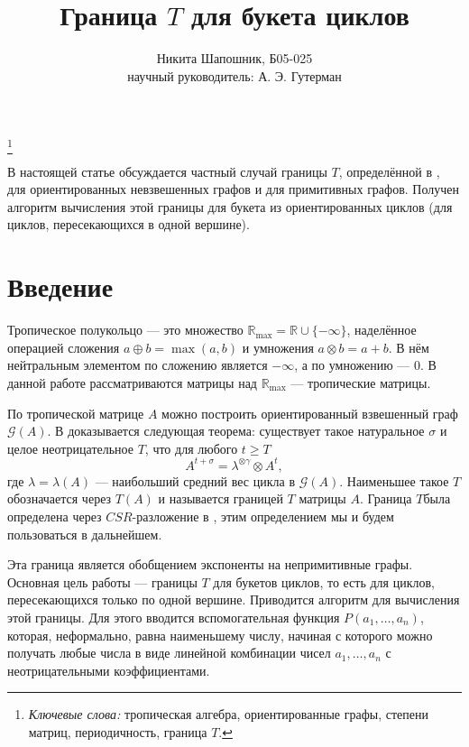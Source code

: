 \documentclass[12pt]{article}
\title{Граница $T$ для букета циклов}
\author{Никита Шапошник, Б05-025\\ научный руководитель: А. Э. Гутерман}
\date{}
\newcommand\blfootnote[1]{%
  \begingroup
  \renewcommand\thefootnote{}\footnote{#1}%
  \addtocounter{footnote}{-1}%
  \endgroup
}
\begin{document}
\maketitle

\blfootnote{\textit{Ключевые слова:} тропическая алгебра, ориентированные графы, степени матриц, периодичность, граница $T$.}

В настоящей статье обсуждается частный случай границы $T$, определённой в \cite{maxAlgebraicPowers}, для ориентированных невзвешенных графов и для примитивных графов. Получен алгоритм вычисления этой границы для букета из ориентированных циклов (для циклов, пересекающихся в одной вершине).

\section{Введение}

Тропическое полукольцо --- это множество $\mathbb{R}_{\max} = \mathbb{R} \cup \{ -\infty \}$, наделённое операцией сложения $a \oplus b = \max(a, b)$ и умножения $a \otimes b = a + b$. В нём нейтральным элементом по сложению является $-\infty$, а по умножению --- $0$. В данной работе рассматриваются матрицы над $\mathbb{R}_{\max}$ --- тропические матрицы.

По тропической матрице $A$ можно построить ориентированный взвешенный граф $\mathcal{G}(A)$. В \cite{maxAlgebraicPowers} доказывается следующая теорема: существует такое натуральное $\sigma$ и целое неотрицательное $T$, что для любого $t \ge T$\begin{equation*}
A^{t + \sigma} = \lambda^{\otimes \gamma} \otimes A^t,
\end{equation*}
где $\lambda = \lambda(A)$ --- наибольший средний вес цикла в $\mathcal{G}(A)$. Наименьшее такое $T$ обозначается через $T(A)$ и называется границей $T$ матрицы $A$. Граница $T $была определена через $CSR$-разложение в \cite{maxAlgebraicPowers}, этим определением мы и будем пользоваться в дальнейшем.

Эта граница является обобщением экспоненты на непримитивные графы. Основная цель работы --- границы $T$ для букетов циклов, то есть для циклов, пересекающихся только по одной вершине. Приводится алгоритм для вычисления этой границы. Для этого вводится вспомогательная функция $P(a_1, \dots, a_n)$, которая, неформально, равна наименьшему числу, начиная с которого можно получать любые числа в виде линейной комбинации чисел $a_1, \dots, a_n$ с неотрицательными коэффициентами.
\end{document}
